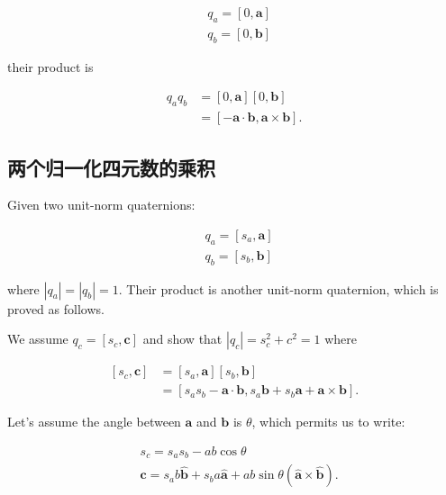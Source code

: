 $$
    \begin{aligned}
         & q_{a}=[0, \mathbf{a}] \\
         & q_{b}=[0, \mathbf{b}]
    \end{aligned}
$$

their product is

$$
    \begin{aligned}
        q_{a} q_{b} & =[0, \mathbf{a}][0, \mathbf{b}]                                 \\
                    & =[-\mathbf{a} \cdot \mathbf{b}, \mathbf{a} \times \mathbf{b}] .
    \end{aligned}
$$

\subsection{两个归一化四元数的乘积}
Given two unit-norm quaternions:

$$
    \begin{aligned}
         & q_{a}=\left[s_{a}, \mathbf{a}\right] \\
         & q_{b}=\left[s_{b}, \mathbf{b}\right]
    \end{aligned}
$$

where $\left|q_{a}\right|=\left|q_{b}\right|=1$. Their product is another unit-norm quaternion, which is proved as follows.

We assume $q_{c}=\left[s_{c}, \mathbf{c}\right]$ and show that $\left|q_{c}\right|=s_{c}^{2}+c^{2}=1$ where

$$
    \begin{aligned}
        {\left[s_{c}, \mathbf{c}\right] } & =\left[s_{a}, \mathbf{a}\right]\left[s_{b}, \mathbf{b}\right]                                                           \\
                                          & =\left[s_{a} s_{b}-\mathbf{a} \cdot \mathbf{b}, s_{a} \mathbf{b}+s_{b} \mathbf{a}+\mathbf{a} \times \mathbf{b}\right] .
    \end{aligned}
$$

Let's assume the angle between $\mathbf{a}$ and $\mathbf{b}$ is $\theta$, which permits us to write:

$$
    \begin{aligned}
         & s_{c}=s_{a} s_{b}-a b \cos \theta                                                                                        \\
         & \mathbf{c}=s_{a} b \hat{\mathbf{b}}+s_{b} a \hat{\mathbf{a}}+a b \sin \theta(\hat{\mathbf{a}} \times \hat{\mathbf{b}}) .
    \end{aligned}
$$

